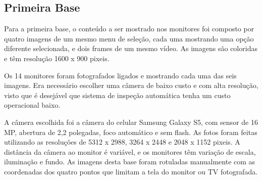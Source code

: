\subsection{Primeira Base}


Para a primeira base, o conteúdo a ser mostrado nos monitores foi composto por quatro imagens de um mesmo menu de seleção, cada uma mostrando uma opção diferente selecionada, e dois frames de um mesmo vídeo. As imagens são coloridas e têm resolução 1600 x 900 pixeis.

Os 14 monitores foram fotografados ligados e mostrando cada uma das seis imagens. Era necessário escolher uma câmera de baixo custo e com alta resolução, visto que é desejável que sistema de inspeção automática tenha um custo operacional baixo.

A câmera escolhida foi a câmera do celular Samsung Galaxy S5, com sensor de 16 MP, abertura de 2,2 polegadas, foco automático e sem flash. As fotos foram feitas utilizando as resoluções de 5312 x 2988, 3264 x 2448 e 2048 x 1152 pixeis. A distância da câmera ao monitor é variável, e os monitores têm variação de escala, iluminação e fundo. As imagens desta base foram rotuladas manualmente com as coordenadas dos quatro pontos que limitam a tela do monitor ou TV fotografada.

